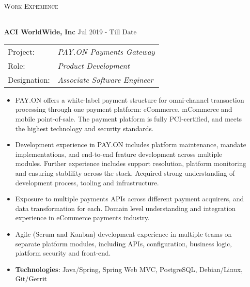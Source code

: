 \documentclass[a4paper]{article}
\newcommand{\lineunder} {
    \vspace*{-8pt} \\
    \hspace*{-18pt} \hrulefill \\
}
\newcommand{\header} [1] {
    {\hspace*{-18pt}\vspace*{6pt} \textsc{#1}}
    \vspace*{-6pt} \lineunder
}
\begin{document}
\header{Work Experience}
\vspace{1mm}

\textbf{ACI WorldWide, Inc} \hfill Jul 2019 - Till Date\\
\begin{tabular}{ l l }
Project: & \textit{PAY.ON Payments Gateway} \\
Role: & \textit{Product Development} \\
Designation: & \textit{Associate Software Engineer}
\end{tabular}
\vspace{-1mm}
\begin{itemize} \itemsep 1pt
	\item PAY.ON offers a white-label payment structure for omni-channel transaction processing through one payment platform: eCommerce, mCommerce and mobile point-of-sale. The payment platform is fully PCI-certified, and meets the highest technology and security standards.
	\item Development experience in PAY.ON includes platform maintenance, mandate implementations, and end-to-end feature development across multiple modules. Further experience includes support resolution, platform monitoring and ensuring stablility across the stack. Acquired strong understanding of development process, tooling and infrastructure.
  \item Exposure to multiple payments APIs across different payment acquirers, and data transformation for each. Domain level understanding and integration experience in eCommerce payments industry.
  \item Agile (Scrum and Kanban) development experience in multiple teams on separate platform modules, including APIs, configuration, business logic, platform security and front-end.
	\item \textbf{Technologies}: Java/Spring, Spring Web MVC, PostgreSQL, Debian/Linux, Git/Gerrit
\end{itemize}
\end{document}
